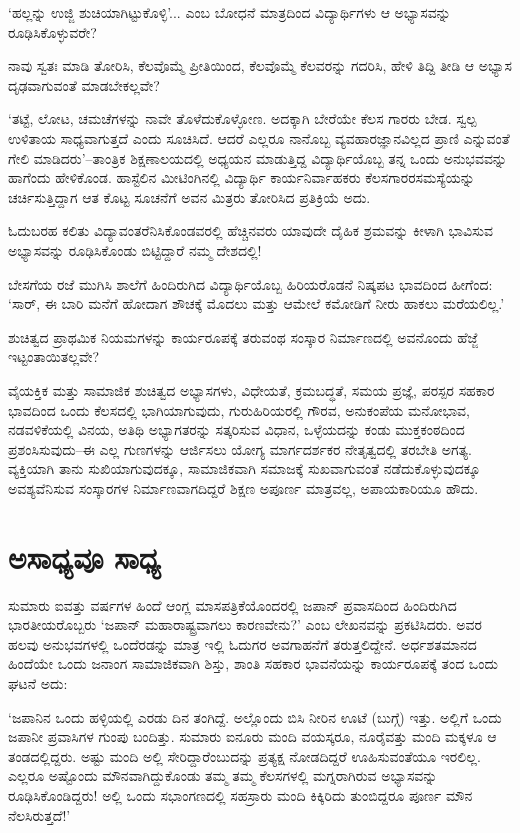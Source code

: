 ‘ಹಲ್ಲನ್ನು ಉಜ್ಜಿ ಶುಚಿಯಾಗಿಟ್ಟುಕೊಳ್ಳಿ’... ಎಂಬ ಬೋಧನೆ ಮಾತ್ರದಿಂದ ವಿದ್ಯಾರ್ಥಿಗಳು ಆ ಅಭ್ಯಾಸವನ್ನು ರೂಢಿಸಿಕೊಳ್ಳುವರೇ?

ನಾವು ಸ್ವತಃ ಮಾಡಿ ತೋರಿಸಿ, ಕೆಲವೊಮ್ಮೆ ಪ್ರೀತಿಯಿಂದ, ಕೆಲವೊಮ್ಮೆ ಕೆಲವರನ್ನು ಗದರಿಸಿ, ಹೇಳಿ ತಿದ್ದಿ ತೀಡಿ ಆ ಅಭ್ಯಾಸ ದೃಢವಾಗುವಂತೆ ಮಾಡಬೇಕಲ್ಲವೇ?

‘ತಟ್ಟೆ, ಲೋಟ, ಚಮಚೆಗಳನ್ನು ನಾವೇ ತೊಳೆದುಕೊಳ್ಳೋಣ. ಅದಕ್ಕಾಗಿ ಬೇರೆಯೇ ಕೆಲಸ ಗಾರರು ಬೇಡ. ಸ್ವಲ್ಪ ಉಳಿತಾಯ ಸಾಧ್ಯವಾಗುತ್ತದೆ ಎಂದು ಸೂಚಿಸಿದೆ. ಆದರೆ ಎಲ್ಲರೂ ನಾನೊಬ್ಬ ವ್ಯವಹಾರಜ್ಞಾನವಿಲ್ಲದ ಪ್ರಾಣಿ ಎನ್ನುವಂತೆ ಗೇಲಿ ಮಾಡಿದರು’–ತಾಂತ್ರಿಕ ಶಿಕ್ಷಣಾಲಯ\-ದಲ್ಲಿ ಅಧ್ಯಯನ ಮಾಡುತ್ತಿದ್ದ ವಿದ್ಯಾರ್ಥಿಯೊಬ್ಬ ತನ್ನ ಒಂದು ಅನುಭವವನ್ನು ಹಾಗೆಂದು ಹೇಳಿಕೊಂಡ. ಹಾಸ್ಟೆಲಿನ ಮೀಟಿಂಗಿನಲ್ಲಿ ವಿದ್ಯಾರ್ಥಿ ಕಾರ್ಯನಿರ್ವಾಹಕರು ಕೆಲಸಗಾರರ\break ಸಮಸ್ಯೆಯನ್ನು ಚರ್ಚಿಸುತ್ತಿದ್ದಾಗ ಆತ ಕೊಟ್ಟ ಸೂಚನೆಗೆ ಅವನ ಮಿತ್ರರು ತೋರಿಸಿದ ಪ್ರತಿಕ್ರಿಯೆ ಅದು.

ಓದುಬರಹ ಕಲಿತು ವಿದ್ಯಾವಂತರೆನಿಸಿಕೊಂಡವರಲ್ಲಿ ಹೆಚ್ಚಿನವರು ಯಾವುದೇ ದೈಹಿಕ ಶ್ರಮವನ್ನು ಕೀಳಾಗಿ ಭಾವಿಸುವ ಅಭ್ಯಾಸವನ್ನು ರೂಢಿಸಿಕೊಂಡು ಬಿಟ್ಟಿದ್ದಾರೆ ನಮ್ಮ ದೇಶದಲ್ಲಿ!

ಬೇಸಗೆಯ ರಜೆ ಮುಗಿಸಿ ಶಾಲೆಗೆ ಹಿಂದಿರುಗಿದ ವಿದ್ಯಾರ್ಥಿಯೊಬ್ಬ ಹಿರಿಯರೊಡನೆ ನಿಷ್ಕಪಟ ಭಾವದಿಂದ ಹೀಗೆಂದ: ‘ಸಾರ್, ಈ ಬಾರಿ ಮನೆಗೆ ಹೋದಾಗ ಶೌಚಕ್ಕೆ ಮೊದಲು ಮತ್ತು ಆಮೇಲೆ ಕಮೋಡಿಗೆ ನೀರು ಹಾಕಲು ಮರೆಯಲಿಲ್ಲ.’

ಶುಚಿತ್ವದ ಪ್ರಾಥಮಿಕ ನಿಯಮಗಳನ್ನು ಕಾರ್ಯರೂಪಕ್ಕೆ ತರುವಂಥ ಸಂಸ್ಕಾರ ನಿರ್ಮಾಣದಲ್ಲಿ ಅವನೊಂದು ಹೆಜ್ಜೆ ಇಟ್ಟಂತಾಯಿತಲ್ಲವೇ?

ವೈಯಕ್ತಿಕ ಮತ್ತು ಸಾಮಾಜಿಕ ಶುಚಿತ್ವದ ಅಭ್ಯಾಸಗಳು, ವಿಧೇಯತೆ, ಕ್ರಮಬದ್ಧತೆ, ಸಮಯ ಪ್ರಜ್ಞೆ, ಪರಸ್ಪರ ಸಹಕಾರ ಭಾವದಿಂದ ಒಂದು ಕೆಲಸದಲ್ಲಿ ಭಾಗಿಯಾಗುವುದು, ಗುರುಹಿರಿಯರಲ್ಲಿ ಗೌರವ, ಅನುಕಂಪೆಯ ಮನೋಭಾವ, ನಡವಳಿಕೆಯಲ್ಲಿ ವಿನಯ, ಅತಿಥಿ ಅಭ್ಯಾಗತರನ್ನು ಸತ್ಕರಿಸುವ ವಿಧಾನ, ಒಳ್ಳೆಯದನ್ನು ಕಂಡು ಮುಕ್ತಕಂಠದಿಂದ ಪ್ರಶಂಸಿಸುವುದು–ಈ ಎಲ್ಲ ಗುಣಗಳನ್ನು ಆರ್ಜಿಸಲು ಯೋಗ್ಯ ಮಾರ್ಗದರ್ಶಕರ ನೇತೃತ್ವದಲ್ಲಿ ತರಬೇತಿ ಅಗತ್ಯ. ವ್ಯಕ್ತಿಯಾಗಿ ತಾನು ಸುಖಿಯಾಗುವುದಕ್ಕೂ, ಸಾಮಾಜಿಕವಾಗಿ ಸಮಾಜಕ್ಕೆ ಸುಖವಾಗುವಂತೆ ನಡೆದುಕೊಳ್ಳುವುದಕ್ಕೂ ಅವಶ್ಯವೆನಿಸುವ ಸಂಸ್ಕಾರಗಳ ನಿರ್ಮಾಣವಾಗದಿದ್ದರೆ ಶಿಕ್ಷಣ ಅಪೂರ್ಣ ಮಾತ್ರವಲ್ಲ, ಅಪಾಯ\-ಕಾರಿಯೂ ಹೌದು.


\section*{ಅಸಾಧ್ಯವೂ ಸಾಧ್ಯ}


ಸುಮಾರು ಐವತ್ತು ವರ್ಷಗಳ ಹಿಂದೆ ಆಂಗ್ಲ ಮಾಸಪತ್ರಿಕೆಯೊಂದರಲ್ಲಿ ಜಪಾನ್ ಪ್ರವಾಸದಿಂದ ಹಿಂದಿರುಗಿದ ಭಾರತೀಯರೊಬ್ಬರು ‘ಜಪಾನ್ ಮಹಾರಾಷ್ಟ್ರವಾಗಲು ಕಾರಣವೇನು?’ ಎಂಬ ಲೇಖನವನ್ನು ಪ್ರಕಟಿಸಿದರು. ಅವರ ಹಲವು ಅನುಭವಗಳಲ್ಲಿ ಒಂದೆರಡನ್ನು ಮಾತ್ರ ಇಲ್ಲಿ ಓದುಗರ ಅವಗಾಹನೆಗೆ ತರುತ್ತಲಿದ್ದೇನೆ. ಅರ್ಧಶತಮಾನದ ಹಿಂದೆಯೇ ಒಂದು ಜನಾಂಗ ಸಾಮಾಜಿಕವಾಗಿ ಶಿಸ್ತು, ಶಾಂತಿ ಸಹಕಾರ ಭಾವನೆಯನ್ನು ಕಾರ್ಯರೂಪಕ್ಕೆ ತಂದ ಒಂದು ಘಟನೆ ಅದು:

‘ಜಪಾನಿನ ಒಂದು ಹಳ್ಳಿಯಲ್ಲಿ ಎರಡು ದಿನ ತಂಗಿದ್ದೆ. ಅಲ್ಲೊಂದು ಬಿಸಿ ನೀರಿನ ಊಟೆ (ಬುಗ್ಗೆ) ಇತ್ತು. ಅಲ್ಲಿಗೆ ಒಂದು ಜಪಾನೀ ಪ್ರವಾಸಿಗಳ ಗುಂಪು ಬಂದಿತ್ತು. ಸುಮಾರು ಐನೂರು ಮಂದಿ ವಯಸ್ಕರೂ, ನೂರೈವತ್ತು ಮಂದಿ ಮಕ್ಕಳೂ ಆ ತಂಡದಲ್ಲಿದ್ದರು. ಅಷ್ಟು ಮಂದಿ ಅಲ್ಲಿ ಸೇರಿದ್ದಾರೆಂಬುದನ್ನು ಪ್ರತ್ಯಕ್ಷ ನೋಡದಿದ್ದರೆ ಊಹಿಸುವಂತೆಯೂ ಇರಲಿಲ್ಲ. ಎಲ್ಲರೂ ಅಷ್ಟೊಂದು ಮೌನವಾಗಿದ್ದುಕೊಂಡು ತಮ್ಮ ತಮ್ಮ ಕೆಲಸಗಳಲ್ಲಿ ಮಗ್ನರಾಗಿರುವ ಅಭ್ಯಾಸವನ್ನು ರೂಢಿಸಿಕೊಂಡಿದ್ದರು! ಅಲ್ಲಿ ಒಂದು ಸಭಾಂಗಣದಲ್ಲಿ ಸಹಸ್ರಾರು ಮಂದಿ ಕಿಕ್ಕಿರಿದು ತುಂಬಿದ್ದರೂ ಪೂರ್ಣ ಮೌನ ನೆಲಸಿರುತ್ತದೆ!’

